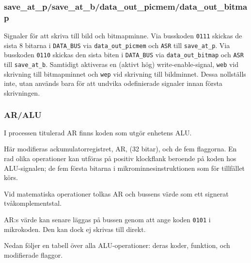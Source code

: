 \documentclass[]{article}
\begin{document}
\subsubsection{save\_at\_p/save\_at\_b/data\_out\_picmem/data\_out\_bitmap}

Signaler för att skriva till bild och bitmapminne. Via busskoden \texttt{0111} skickas de sista 8 bitarna i \texttt{DATA\_BUS} via \texttt{data\_out\_picmem} och \texttt{ASR} till \texttt{save\_at\_p}. Via busskoden \texttt{0110} skickas den sista biten i \texttt{DATA\_BUS} via \texttt{data\_out\_bitmap} och \texttt{ASR} till \texttt{save\_at\_b}. Samtidigt aktiveras en (aktivt hög) write-enable-signal, \texttt{web} vid skrivning till bitmapminnet och \texttt{wep} vid skrivning till bildminnet. Dessa nollställs inte, utan används bara för att undvika odefinierade signaler innan första skrivningen.

\subsubsection{AR/ALU}

I processen titulerad AR finns koden som utgör enhetens ALU.

Här modifieras ackumulatorregistret, AR, (32 bitar), och de fem flaggorna. En rad olika operationer kan utföras på positiv klockflank beroende på koden hos ALU-signalen; de fem första bitarna i mikrominnesinstruktionen som för tillfället körs.

Vid matematiska operationer tolkas AR och bussens värde som ett signerat tvåkomplementstal.

AR:s värde kan senare läggas på bussen genom att ange koden \texttt{0101} i mikrokoden. Den kan dock ej skrivas till direkt.

Nedan följer en tabell över alla ALU-operationer: deras koder, funktion, och modifierade flaggor.
\\
\end{document}
